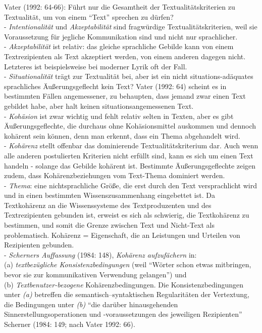 \documentclass[
  letterpaper,
  DIV=11,
  numbers=noendperiod]{scrreprt}
\begin{document}
Vater (1992: 64-66): Führt nur die Gesamtheit der Textualitätskriterien
zu Textualität, um von einem ``Text'' sprechen zu dürfen?\\
- \emph{Intentionalität} und \emph{Akzeptabilität} sind fragwürdige
Textualitätskriterien, weil sie Voraussetzung für jegliche Kommunikation
sind und nicht nur sprachlicher.\\
- \emph{Akzeptabilität} ist relativ: das gleiche sprachliche Gebilde
kann von einem Textrezipienten als Text akzeptiert werden, von einem
anderen dagegen nicht. Letzteres ist beispielsweise bei moderner Lyrik
oft der Fall.\\
- \emph{Situationalität} trägt zur Textualität bei, aber ist ein nicht
situations-adäquates sprachliches Äußerungsgeflecht kein Text? Vater
(1992: 64) scheint es in bestimmten Fällen angemessener, zu behaupten,
dass jemand zwar einen Text gebildet habe, aber halt keinen
situationsangemessenen Text.\\
- \emph{Kohäsion} ist zwar wichtig und fehlt relativ selten in Texten,
aber es gibt Äußerungsgeflechte, die durchaus ohne Kohäsionsmittel
auskommen und dennoch kohärent sein können, denn man erkennt, dass ein
Thema abgehandelt wird.\\
- \emph{Kohärenz} stellt offenbar das dominierende Textualitätskriterium
dar. Auch wenn alle anderen postulierten Kriterien nicht erfüllt sind,
kann es sich um einen Text handeln - solange das Gebilde kohärent ist.
Bestimmte Äußerungsgeflechte zeigen zudem, dass Kohärenzbeziehungen vom
Text-Thema dominiert werden.\\
- \emph{Thema}: eine nichtsprachliche Größe, die erst durch den Text
versprachlicht wird und in einen bestimmten Wissenszusammenhang
eingebettet ist. Da Textkohärenz an die Wissenssysteme des
Textproduzenten und des Textrezipienten gebunden ist, erweist es sich
als schwierig, die Textkohärenz zu bestimmen, und somit die Grenze
zwischen Text und Nicht-Text als problematisch. Kohärenz = Eigenschaft,
die an Leistungen und Urteilen von Rezipienten gebunden.\\
- \emph{Scherners Auffassung} (1984: 148), \emph{Kohärenz aufzufächern}
in:\\
(a) \emph{textbezügliche Konsistenzbedingungen} (weil ``Wörter schon
etwas mitbringen, bevor sie zur kommunikativen Verwendung gelangen'')
und\\
(b) \emph{Textbenutzer-bezogene} Kohärenzbedingungen. Die
Konsistenzbedingungen unter \emph{(a)} betreffen die
semantisch--syntaktischen Regularitäten der Vertextung, die Bedingungen
unter \emph{(b)} ``die darüber hinausgehenden Sinnerstellungsoperationen
und -voraussetzungen des jeweiligen Rezipienten'' Scherner (1984: 149;
nach Vater 1992: 66).
\end{document}
